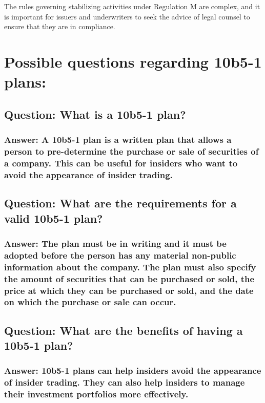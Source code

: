 \documentclass[11pt]{article}
\begin{document}
The rules governing stabilizing activities under Regulation M are complex, and it is important for issuers and underwriters to seek the advice of legal counsel to ensure that they are in compliance.




\section{Possible questions regarding 10b5-1 plans:}
\label{sec:org577dd20}

\subsection{Question: What is a 10b5-1 plan?}
\label{sec:org7257a06}

\subsubsection{Answer: A 10b5-1 plan is a written plan that allows a person to pre-determine the purchase or sale of securities of a company. This can be useful for insiders who want to avoid the appearance of insider trading.}
\label{sec:org267e736}

\subsection{Question: What are the requirements for a valid 10b5-1 plan?}
\label{sec:org5ab0f0d}

\subsubsection{Answer: The plan must be in writing and it must be adopted before the person has any material non-public information about the company. The plan must also specify the amount of securities that can be purchased or sold, the price at which they can be purchased or sold, and the date on which the purchase or sale can occur.}
\label{sec:org30dd2a8}

\subsection{Question: What are the benefits of having a 10b5-1 plan?}
\label{sec:orga80fbd5}

\subsubsection{Answer: 10b5-1 plans can help insiders avoid the appearance of insider trading. They can also help insiders to manage their investment portfolios more effectively.}
\label{sec:orgeb6ff80}
\end{document}
